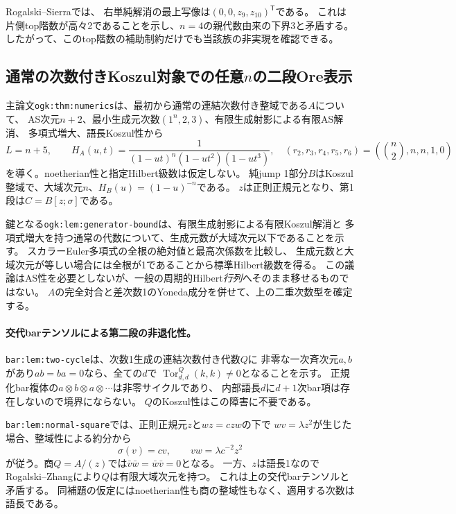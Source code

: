 \documentclass[11pt,a4paper]{ltjsarticle}
\begin{document}
Rogalski--Sierra\cite[Proposition 5.4, (5.5)--(5.6), Proposition 5.11(1)]{RSsurface}では、
右単純解消の最上写像は$(0,0,z_9,z_{10})^{\mathsf T}$である。
これは片側top階数が高々2であることを示し、$n=4$の親代数由来の下界3と矛盾する。
したがって、このtop階数の補助制約だけでも当該族の非実現を確認できる。

\subsection{通常の次数付きKoszul対象での任意\texorpdfstring{$n$}{n}の二段Ore表示}
\label{note:ordinary-koszul-numerics}
主論文\texttt{ogk:thm:numerics}は、最初から通常の連結次数付き整域である$A$について、
AS次元$n+2$、最小生成元次数$(1^n,2,3)$、有限生成射影による有限AS解消、
多項式増大、語長Koszul性から
\[
L=n+5,\qquad
H_A(u,t)=\frac1{(1-ut)^n(1-ut^2)(1-ut^3)},\quad
(r_2,r_3,r_4,r_5,r_6)=\left(\binom n2,n,n,1,0\right)
\]
を導く。noetherian性と指定Hilbert級数は仮定しない。
純jump 1部分$B$はKoszul整域で、大域次元$n$、$H_B(u)=(1-u)^{-n}$である。
$z$は正則正規元となり、第1段は$C=B[z;\sigma]$である。

鍵となる\texttt{ogk:lem:generator-bound}は、有限生成射影による有限Koszul解消と
多項式増大を持つ通常の代数について、生成元数が大域次元以下であることを示す。
スカラーEuler多項式の全根の絶対値と最高次係数を比較し、
生成元数と大域次元が等しい場合には全根が1であることから標準Hilbert級数を得る。
この議論はAS性を必要としないが、一般の周期的Hilbert\emph{行列}へそのまま移せるものではない。
$A$の完全対合と差次数1のYoneda成分を併せて、上の二重次数型を確定する。

\paragraph{交代barテンソルによる第二段の非退化性。}
\texttt{bar:lem:two-cycle}は、次数1生成の連結次数付き代数$Q$に
非零な一次斉次元$a,b$があり$ab=ba=0$なら、全ての$d$で
$\operatorname{Tor}^Q_{d,d}(k,k)\ne0$となることを示す。
正規化bar複体の$a\otimes b\otimes a\otimes\cdots$は非零サイクルであり、
内部語長$d$に$d+1$次bar項は存在しないので境界にならない。
$Q$のKoszul性はこの障害に不要である。

\texttt{bar:lem:normal-square}では、正則正規元$z$と$wz=c zw$の下で
$wv=\lambda z^2$が生じた場合、整域性による約分から
\[
\sigma(v)=cv,\qquad vw=\lambda c^{-2}z^2
\]
が従う。商$Q=A/(z)$では$\bar v\bar w=\bar w\bar v=0$となる。
一方、$z$は語長1なのでRogalski--Zhang\cite[Lemma 1.1]{RZ}により$Q$は有限大域次元を持つ。
これは上の交代barテンソルと矛盾する。
同補題の仮定にはnoetherian性も商の整域性もなく、適用する次数は語長である。
\end{document}
